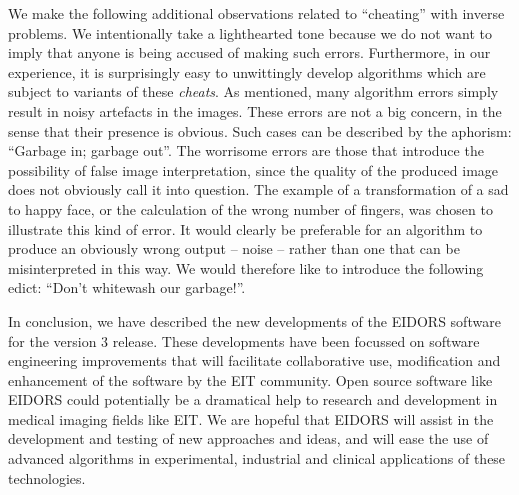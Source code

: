 \documentclass[12pt]{iopart}
\begin{document}
We make the following additional observations related to 
``cheating'' with inverse problems.
We intentionally take a
lighthearted tone because we do not want to
imply that anyone is being accused of making such errors.
Furthermore, in our experience, it 
is surprisingly easy to unwittingly develop
algorithms which are subject to variants of these {\em cheats}.
As mentioned, many algorithm errors simply result in 
noisy artefacts in the images. These errors are not a big
concern, in the sense that their presence is obvious.
Such cases can be described by the aphorism:
``Garbage in; garbage out''.
The worrisome errors are those that introduce the possibility
of false image interpretation, since the quality of the
produced image does not obviously call it into question.
The example of a transformation of a sad to happy face,
or the calculation of the wrong number of fingers, 
was chosen to illustrate this kind of error. It would
clearly be preferable for an algorithm to produce an
obviously wrong output -- noise -- rather than one
that can be misinterpreted in this way. We would therefore like
to introduce the following edict: 
``Don't whitewash our garbage!''.


In conclusion, we have described the new
developments of the EIDORS software for the
version 3 release. These developments have been 
focussed on software engineering improvements that
will facilitate collaborative use, modification and
enhancement of the software by the EIT community.
Open source software like EIDORS could
potentially be a dramatical help to
research and development in medical imaging fields like EIT.
We are hopeful that EIDORS will assist in the development
and testing of new approaches and ideas, and will
ease the use of advanced algorithms in experimental,
industrial and clinical applications of these technologies.
\end{document}
